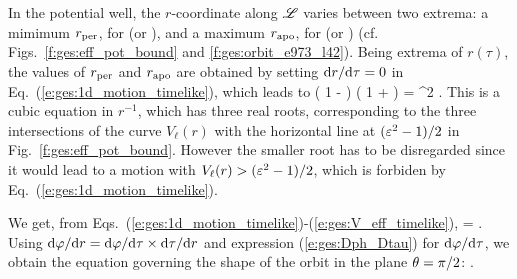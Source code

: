 In the potential well, the $r$-coordinate along $\mathscr{L}$ varies between two
extrema: a mimimum $r_{\rm per}$, for  (or
), and
a maximum
$r_{\rm apo}$, for  (or ) (cf. Figs.~\ref{f:ges:eff_pot_bound} and \ref{f:ges:orbit_e973_l42}). Being extrema of $r(\tau)$,
the values of $r_{\rm per}$ and $r_{\rm apo}$ are obtained by setting
$\mathrm{d} r /\mathrm{d}\tau =0$ in Eq.~(\ref{e:ges:1d_motion_timelike}), which leads to
\be
    \left( 1 -  \right) \left( 1 +  \right)
        = \veps^2 .
\ee
This is a cubic equation in $r^{-1}$, which has three real roots, corresponding
to the three intersections of the curve $V_{\ell}(r)$ with the horizontal
line at $(\varepsilon^2-1)/2$ in Fig.~\ref{f:ges:eff_pot_bound}. However the smaller
root has to be disregarded since it would lead to a motion with
$V_{\ell}(r) > (\varepsilon^2-1)/2$, which is forbiden by Eq.~(\ref{e:ges:1d_motion_timelike}).

We get, from Eqs.~(\ref{e:ges:1d_motion_timelike})-(\ref{e:ges:V_eff_timelike}),
\be
     = \pm
     .
\ee
Using $\mathrm{d}\varphi/\mathrm{d} r = \mathrm{d}\varphi /\mathrm{d}\tau \times \mathrm{d}\tau/\mathrm{d} r$ and expression
(\ref{e:ges:Dph_Dtau}) for $\mathrm{d}\varphi /\mathrm{d}\tau$, we obtain the equation governing
the shape of the orbit in the plane $\theta=\pi/2$:
\be
     .
\ee


